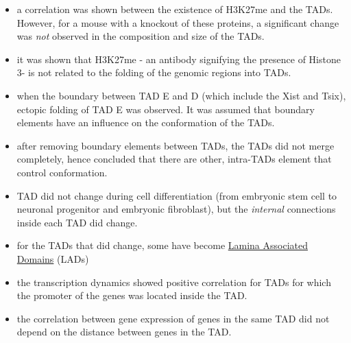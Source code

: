 \documentclass[12pt]{book}
\begin{document}
\begin{itemize}
\item a correlation was shown between the existence of H3K27me and the TADs. However, for a mouse with a knockout of these proteins, a significant change was \textit{not} observed in the composition and size of the TADs.
\item it was shown that H3K27me - an antibody signifying the presence of Histone 3- is not related to the folding of the genomic regions into TADs. 
\item when the boundary between TAD E and D (which include the Xist and Tsix), ectopic folding of TAD E was observed. It was assumed that boundary elements have an influence on the conformation of the TADs. 
\item after removing boundary elements between TADs, the TADs did not merge completely, hence concluded that there are other, intra-TADs element that control conformation.
\item TAD did not change during cell differentiation (from embryonic stem cell to neuronal progenitor and embryonic fibroblast), but the \textit{internal} connections inside each TAD did change.
\item for the TADs that did change, some have become \href{http://www.nature.com/nature/journal/v453/n7197/full/nature06947.html}{Lamina Associated Domains} (LADs) 
\item the transcription dynamics showed positive correlation for TADs for which the promoter of the genes was located inside the TAD. 
\item the correlation between gene expression of genes in the same TAD did not depend on the distance between genes in the TAD. 
\end{itemize}
\end{document}
